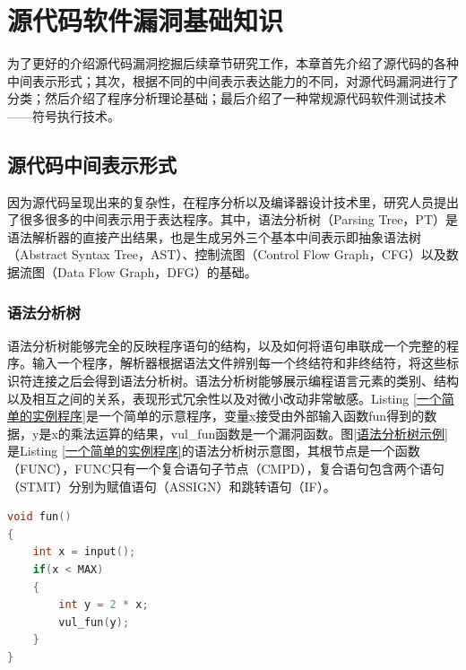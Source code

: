 \chapter{源代码软件漏洞基础知识}

为了更好的介绍源代码漏洞挖掘后续章节研究工作，本章首先介绍了源代码的各种中间表示形式；其次，根据不同的中间表示表达能力的不同，对源代码漏洞进行了分类；然后介绍了程序分析理论基础；最后介绍了一种常规源代码软件测试技术——符号执行技术。

%

\section{源代码中间表示形式}

因为源代码呈现出来的复杂性，在程序分析以及编译器设计技术里，研究人员提出了很多很多的中间表示用于表达程序。其中，语法分析树（Parsing Tree，PT）是语法解析器的直接产出结果，也是生成另外三个基本中间表示即抽象语法树（Abstract Syntax Tree，AST）、控制流图（Control Flow Graph，CFG）以及数据流图（Data Flow Graph，DFG）的基础。

\subsection{语法分析树}

语法分析树能够完全的反映程序语句的结构，以及如何将语句串联成一个完整的程序。输入一个程序，解析器根据语法文件辨别每一个终结符和非终结符，将这些标识符连接之后会得到语法分析树。语法分析树能够展示编程语言元素的类别、结构以及相互之间的关系，表现形式冗余性以及对微小改动非常敏感。Listing \ref{一个简单的实例程序}是一个简单的示意程序，变量x接受由外部输入函数fun得到的数据，y是x的乘法运算的结果，vul\_fun函数是一个漏洞函数。图\ref{语法分析树示例}是Listing \ref{一个简单的实例程序}的语法分析树示意图，其根节点是一个函数{（FUNC）}，FUNC只有一个复合语句子节点{（CMPD）}，复合语句包含两个语句{（STMT）}分别为赋值语句{（ASSIGN）}和跳转语句{（IF）}。

\begin{lstlisting}[language=C,caption=一个简单的实例程序,label=一个简单的实例程序]
void fun()
{
	int x = input();
	if(x < MAX)
	{
		int y = 2 * x;
		vul_fun(y);
	}
}
\end{lstlisting}

